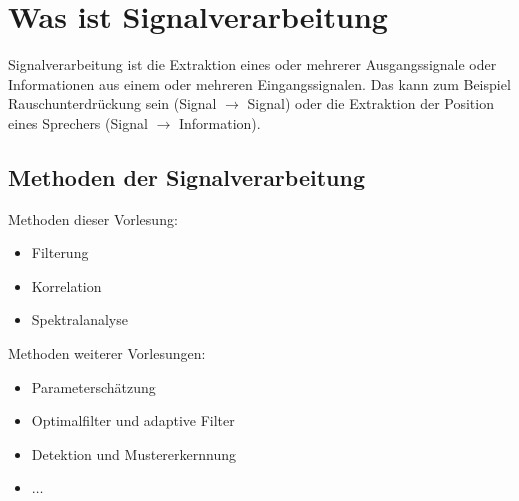 \section{Was ist Signalverarbeitung}
	Signalverarbeitung ist die Extraktion eines oder mehrerer Ausgangssignale oder Informationen aus einem oder mehreren Eingangssignalen. Das kann zum Beispiel Rauschunterdrückung sein (Signal $\rightarrow$ Signal) oder die Extraktion der Position eines Sprechers (Signal $\rightarrow$ Information).
	
	\subsection{Methoden der Signalverarbeitung}
	Methoden dieser Vorlesung:
	\begin{itemize}
		\item Filterung
		\item Korrelation
		\item Spektralanalyse
	\end{itemize}
	Methoden weiterer Vorlesungen:
	\begin{itemize}
		\item Parameterschätzung
		\item Optimalfilter und adaptive Filter
		\item Detektion und Mustererkernnung 
		\item $\dots$
	\end{itemize}
	
